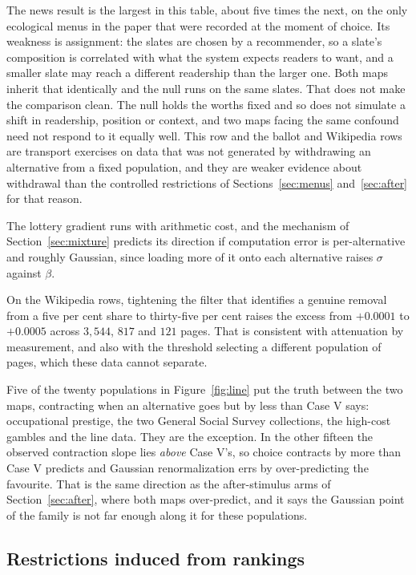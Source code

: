 \documentclass[11pt]{article}
\theoremstyle{italichead}
\begin{document}
The news result is the largest in this table, about five times the next, on the only ecological
menus in the paper that were recorded at the moment of choice. Its weakness is assignment: the slates are chosen
by a recommender, so a slate's composition is correlated with what the system expects readers
to want, and a smaller slate may reach a different readership than the larger one. Both maps
inherit that identically and the null runs on the same slates. That does not make the
comparison clean. The null holds the worths fixed and so does not simulate a shift in
readership, position or context, and two maps facing the same confound need not respond to it
equally well. This row and the ballot and Wikipedia rows are transport exercises on data that was not
generated by withdrawing an alternative from a fixed population, and they are weaker evidence
about withdrawal than the controlled restrictions of Sections~\ref{sec:menus}
and~\ref{sec:after} for that reason.

The lottery gradient runs with arithmetic cost, and the mechanism of
Section~\ref{sec:mixture} predicts its direction if computation error is per-alternative and
roughly Gaussian, since loading more of it onto each alternative raises $\sigma$ against
$\beta$.

On the Wikipedia rows, tightening the filter that identifies a genuine removal from a five per
cent share to thirty-five per cent raises the excess from $+0.0001$ to $+0.0005$ across
$3{,}544$, $817$ and $121$ pages. That is consistent with attenuation by measurement, and also
with the threshold selecting a different population of pages, which these data cannot separate.

Five of the twenty populations in Figure~\ref{fig:line} put the truth between the two maps,
contracting when an alternative goes but by less than Case V says: occupational prestige, the two
General Social Survey collections, the high-cost gambles and the line data. They are the
exception. In the other fifteen the observed contraction slope lies \emph{above} Case V's, so
choice contracts by more than Case V predicts and Gaussian renormalization errs by
over-predicting the favourite. That is the same direction as
the after-stimulus arms of Section~\ref{sec:after}, where both maps over-predict, and it says
the Gaussian point of the family is not far enough along it for these populations.




\subsection{Restrictions induced from rankings}
\label{sec:rankings}
\end{document}
